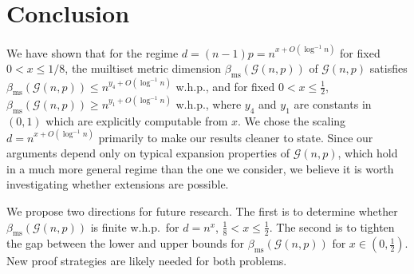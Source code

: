 \documentclass[12pt]{article}
\theoremstyle{definition}
\theoremstyle{remark}
\theoremstyle{remark}
\numberwithin{theorem}{section}
\newcommand{\Gnp}{\mathcal{G}(n,p)}
\begin{document}
\section{Conclusion}\label{sec:conclusion}

We have shown that for the regime $d = (n-1)p = n^{x + O(\log^{-1}n)}$ for fixed $0<x \leq 1/8$, the muiltiset metric dimension $\beta_{\text{ms}}(\Gnp)$ of $\Gnp$ satisfies $\beta_{\text{ms}}(\Gnp) \leq n^{y_{4} + O(\log^{-1}n)}$ w.h.p., and for fixed $0 < x \leq \frac{1}{2}$, $\beta_{\text{ms}}(\Gnp)  \geq n^{y_{1} + O(\log^{-1}n)}$ w.h.p., where $y_{4}$ and $y_{1}$ are constants in $(0,1)$ which are explicitly computable from $x$. We chose the scaling $d = n^{x +O(\log^{-1}n)}$ primarily to make our results cleaner to state. Since our arguments depend only on typical expansion properties of $\Gnp$, which hold in a much more general regime than the one we consider, we believe it is worth investigating whether extensions are possible. 

We propose two directions for future research. The first is to determine whether $\beta_{\text{ms}}(\Gnp)$ is finite w.h.p.\ for $d = n^{x}$, $\frac{1}{8} < x \leq \frac{1}{2}$. The second is to tighten the gap between the lower and upper bounds for $\beta_{\text{ms}}(\Gnp)$ for $x \in (0,\frac{1}{2})$. New proof strategies are likely needed for both problems.


\end{document}
